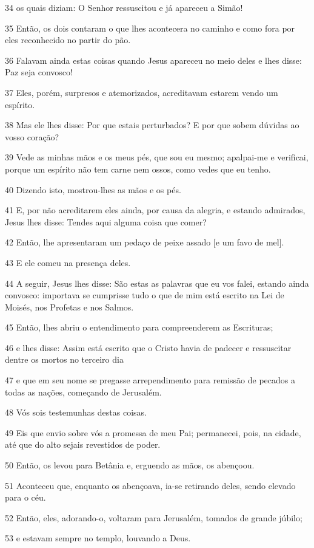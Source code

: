 \par 34 os quais diziam: O Senhor ressuscitou e já apareceu a Simão!
\par 35 Então, os dois contaram o que lhes acontecera no caminho e como fora por eles reconhecido no partir do pão.
\par 36 Falavam ainda estas coisas quando Jesus apareceu no meio deles e lhes disse: Paz seja convosco!
\par 37 Eles, porém, surpresos e atemorizados, acreditavam estarem vendo um espírito.
\par 38 Mas ele lhes disse: Por que estais perturbados? E por que sobem dúvidas ao vosso coração?
\par 39 Vede as minhas mãos e os meus pés, que sou eu mesmo; apalpai-me e verificai, porque um espírito não tem carne nem ossos, como vedes que eu tenho.
\par 40 Dizendo isto, mostrou-lhes as mãos e os pés.
\par 41 E, por não acreditarem eles ainda, por causa da alegria, e estando admirados, Jesus lhes disse: Tendes aqui alguma coisa que comer?
\par 42 Então, lhe apresentaram um pedaço de peixe assado [e um favo de mel].
\par 43 E ele comeu na presença deles.
\par 44 A seguir, Jesus lhes disse: São estas as palavras que eu vos falei, estando ainda convosco: importava se cumprisse tudo o que de mim está escrito na Lei de Moisés, nos Profetas e nos Salmos.
\par 45 Então, lhes abriu o entendimento para compreenderem as Escrituras;
\par 46 e lhes disse: Assim está escrito que o Cristo havia de padecer e ressuscitar dentre os mortos no terceiro dia
\par 47 e que em seu nome se pregasse arrependimento para remissão de pecados a todas as nações, começando de Jerusalém.
\par 48 Vós sois testemunhas destas coisas.
\par 49 Eis que envio sobre vós a promessa de meu Pai; permanecei, pois, na cidade, até que do alto sejais revestidos de poder.
\par 50 Então, os levou para Betânia e, erguendo as mãos, os abençoou.
\par 51 Aconteceu que, enquanto os abençoava, ia-se retirando deles, sendo elevado para o céu.
\par 52 Então, eles, adorando-o, voltaram para Jerusalém, tomados de grande júbilo;
\par 53 e estavam sempre no templo, louvando a Deus.


